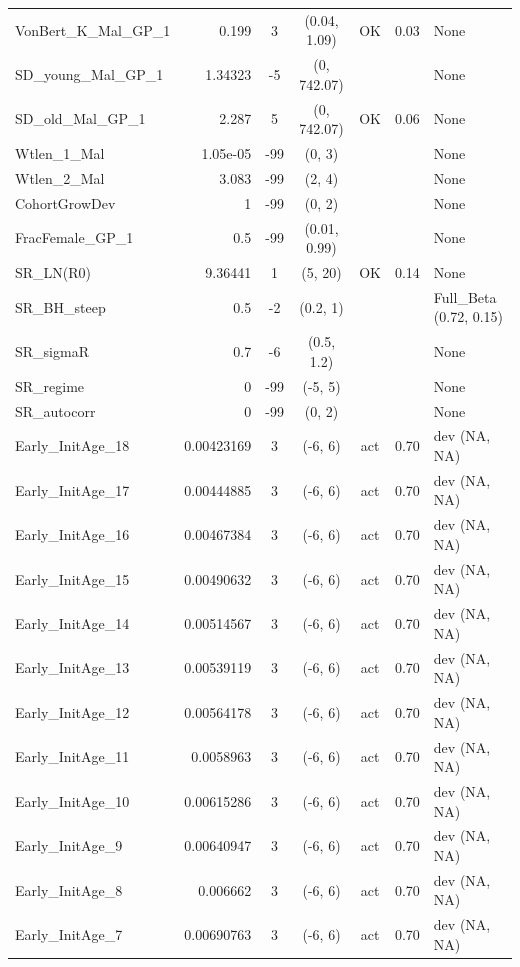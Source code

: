 \documentclass[12pt,]{article}
\begin{document}
\begin{landscape}
\begin{longtable}{lrcccll}
  VonBert\_K\_Mal\_GP\_1 & 0.199 & 3 & (0.04, 1.09) & OK & 0.03 & None \\ 
  SD\_young\_Mal\_GP\_1 & 1.34323 & -5 & (0, 742.07) &  &  & None \\ 
  SD\_old\_Mal\_GP\_1 & 2.287 & 5 & (0, 742.07) & OK & 0.06 & None \\ 
  Wtlen\_1\_Mal & 1.05e-05 & -99 & (0, 3) &  &  & None \\ 
  Wtlen\_2\_Mal & 3.083 & -99 & (2, 4) &  &  & None \\ 
  CohortGrowDev & 1 & -99 & (0, 2) &  &  & None \\ 
  FracFemale\_GP\_1 & 0.5 & -99 & (0.01, 0.99) &  &  & None \\ 
  SR\_LN(R0) & 9.36441 & 1 & (5, 20) & OK & 0.14 & None \\ 
  SR\_BH\_steep & 0.5 & -2 & (0.2, 1) &  &  & Full\_Beta (0.72, 0.15) \\ 
  SR\_sigmaR & 0.7 & -6 & (0.5, 1.2) &  &  & None \\ 
  SR\_regime & 0 & -99 & (-5, 5) &  &  & None \\ 
  SR\_autocorr & 0 & -99 & (0, 2) &  &  & None \\ 
  Early\_InitAge\_18 & 0.00423169 & 3 & (-6, 6) & act & 0.70 & dev (NA, NA) \\ 
  Early\_InitAge\_17 & 0.00444885 & 3 & (-6, 6) & act & 0.70 & dev (NA, NA) \\ 
  Early\_InitAge\_16 & 0.00467384 & 3 & (-6, 6) & act & 0.70 & dev (NA, NA) \\ 
  Early\_InitAge\_15 & 0.00490632 & 3 & (-6, 6) & act & 0.70 & dev (NA, NA) \\ 
  Early\_InitAge\_14 & 0.00514567 & 3 & (-6, 6) & act & 0.70 & dev (NA, NA) \\ 
  Early\_InitAge\_13 & 0.00539119 & 3 & (-6, 6) & act & 0.70 & dev (NA, NA) \\ 
  Early\_InitAge\_12 & 0.00564178 & 3 & (-6, 6) & act & 0.70 & dev (NA, NA) \\ 
  Early\_InitAge\_11 & 0.0058963 & 3 & (-6, 6) & act & 0.70 & dev (NA, NA) \\ 
  Early\_InitAge\_10 & 0.00615286 & 3 & (-6, 6) & act & 0.70 & dev (NA, NA) \\ 
  Early\_InitAge\_9 & 0.00640947 & 3 & (-6, 6) & act & 0.70 & dev (NA, NA) \\ 
  Early\_InitAge\_8 & 0.006662 & 3 & (-6, 6) & act & 0.70 & dev (NA, NA) \\ 
  Early\_InitAge\_7 & 0.00690763 & 3 & (-6, 6) & act & 0.70 & dev (NA, NA) \\ 

\end{longtable}
\end{landscape}
\end{document}
